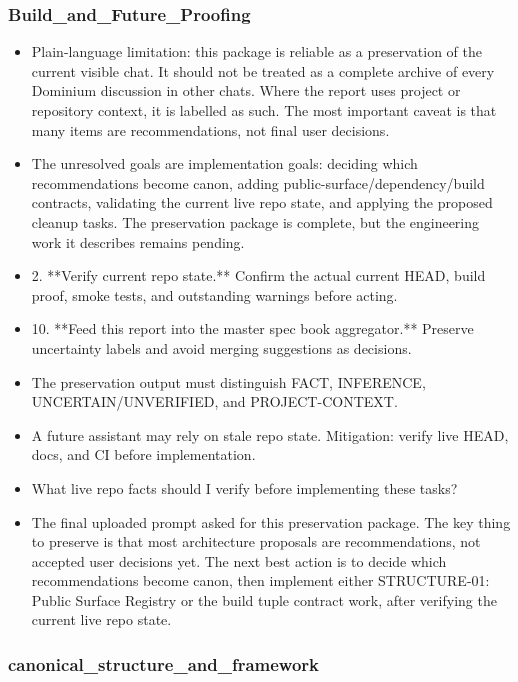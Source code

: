 \documentclass[11pt,a4paper]{report}
\begin{document}
\subsubsection{Build\_and\_Future\_Proofing}

\begin{itemize}
\item Plain-language limitation: this package is reliable as a preservation of the current visible chat. It should not be treated as a complete archive of every Dominium discussion in other chats. Where the report uses project or repository context, it is labelled as such. The most important caveat is that many items are recommendations, not final user decisions.
\item The unresolved goals are implementation goals: deciding which recommendations become canon, adding public-surface/dependency/build contracts, validating the current live repo state, and applying the proposed cleanup tasks. The preservation package is complete, but the engineering work it describes remains pending.
\item 2. **Verify current repo state.** Confirm the actual current HEAD, build proof, smoke tests, and outstanding warnings before acting.
\item 10. **Feed this report into the master spec book aggregator.** Preserve uncertainty labels and avoid merging suggestions as decisions.
\item The preservation output must distinguish FACT, INFERENCE, UNCERTAIN/UNVERIFIED, and PROJECT-CONTEXT.
\item A future assistant may rely on stale repo state. Mitigation: verify live HEAD, docs, and CI before implementation.
\item What live repo facts should I verify before implementing these tasks?
\item The final uploaded prompt asked for this preservation package. The key thing to preserve is that most architecture proposals are recommendations, not accepted user decisions yet. The next best action is to decide which recommendations become canon, then implement either STRUCTURE-01: Public Surface Registry or the build tuple contract work, after verifying the current live repo state.
\end{itemize}

\subsubsection{canonical\_structure\_and\_framework}
\end{document}

